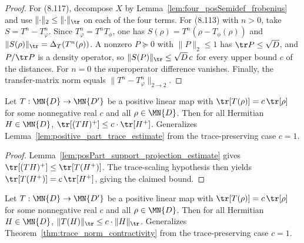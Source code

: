 \begin{proof}\leanok
    For (8.117), decompose $X$ by Lemma~\ref{lem:four_posSemidef_frobenius}
    and use $\lVert\cdot\rVert_2\leq\lVert\cdot\rVert_{\tr}$ on each of the
    four terms. For (8.113) with $n>0$, take $S=T^n-T_\varphi^n$. Since
    $T_\varphi^n=T^nT_\phi$, one has $S(\rho)=T^n(\rho-T_\phi(\rho))$ and
    $\lVert S(\rho)\rVert_{\tr}=\Delta_T(T^n(\rho))$. A nonzero $P\succeq0$
    with $\lVert P\rVert_2\leq1$ has $\tr P\leq\sqrt D$, and $P/\tr P$ is a
    density operator, so $\lVert S(P)\rVert_{\tr}\leq\sqrt D\,c$ for every
    upper bound $c$ of the distances. For $n=0$ the superoperator difference
    vanishes. Finally, the transfer-matrix norm equals
    $\lVert T^n-T_\varphi^n\rVert_{2\to2}$.
\end{proof}

\begin{lemma}
    \label{lem:scaled_posPart_trace_estimate}
    \leanok
    Let $T:\MN{D}\to\MN{D'}$ be a positive linear map with
    $\tr[T(\rho)] = c\,\tr[\rho]$ for some nonnegative real $c$ and
    all $\rho\in\MN{D}$. Then for all Hermitian $H\in\MN{D}$,
    $\tr[(TH)^+]\leq c\cdot\tr[H^+]$.
    Generalizes Lemma~\ref{lem:positive_part_trace_estimate} from the
    trace-preserving case $c=1$.
\end{lemma}

\begin{proof}\leanok
    Lemma~\ref{lem:posPart_support_projection_estimate} gives
    $\tr[(TH)^+]\leq\tr[T(H^+)]$.  The trace-scaling hypothesis then
    yields $\tr[T(H^+)] = c\,\tr[H^+]$, giving the claimed bound.
\end{proof}

\begin{theorem}
    \label{thm:scaled_trace_norm_contractivity}
    \leanok
    Let $T:\MN{D}\to\MN{D'}$ be a positive linear map with
    $\tr[T(\rho)] = c\,\tr[\rho]$ for some nonnegative real $c$ and
    all $\rho\in\MN{D}$. Then for all Hermitian $H\in\MN{D}$,
    $\lVert T(H)\rVert_{\tr}\leq c\cdot\lVert H\rVert_{\tr}$.
    Generalizes Theorem~\ref{thm:trace_norm_contractivity} from the
    trace-preserving case $c=1$.
\end{theorem}

